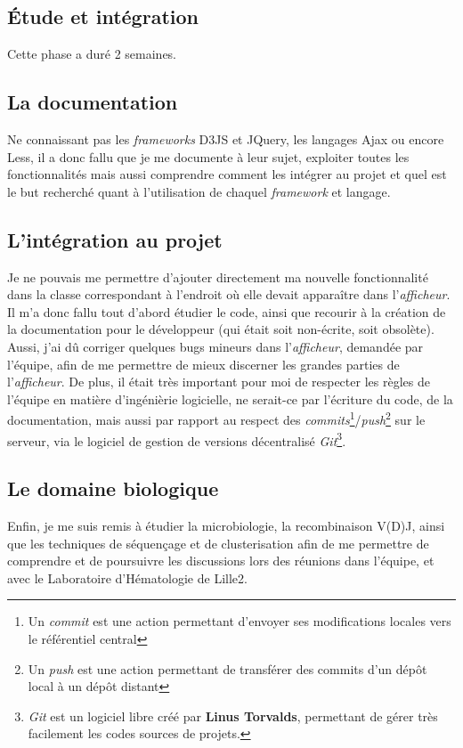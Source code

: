\documentclass[pdftex,12pt,a4paper]{report}
\begin{document}
\begin{spacing}{1.2}
\section{Étude et intégration}

Cette phase a duré 2 semaines.

\subsection{La documentation}
Ne connaissant pas les \textit{frameworks} D3JS et JQuery, les langages Ajax ou encore Less, il a donc fallu que je me documente à leur sujet, exploiter toutes les fonctionnalités mais aussi comprendre comment les intégrer au projet et quel est le but recherché quant à l'utilisation de chaquel \textit{framework} et langage.

\subsection{L'intégration au projet}
Je ne pouvais me permettre d'ajouter directement ma nouvelle fonctionnalité dans la classe correspondant à l'endroit où elle devait apparaître dans l'\textit{afficheur}. Il m'a donc fallu tout d'abord étudier le code, ainsi que recourir à la création de la documentation pour le développeur (qui était soit non-écrite, soit obsolète). Aussi, j'ai dû corriger quelques bugs mineurs dans l'\textit{afficheur}, demandée par l'équipe, afin de me permettre de mieux discerner les grandes parties de l'\textit{afficheur}.
\newline
De plus, il était très important pour moi de respecter les règles de l'équipe en matière d'ingénièrie logicielle, ne serait-ce par l'écriture du code, de la documentation, mais aussi par rapport au respect des \textit{commits}\footnote{Un \textit{commit} est une action permettant d'envoyer ses modifications locales vers le référentiel central}/\textit{push}\footnote{Un \textit{push} est une action permettant de transférer des commits d'un dépôt local à un dépôt distant} sur le serveur, via le logiciel de gestion de versions décentralisé \textit{Git}\footnote{\textit{Git} est un logiciel libre créé par \textbf{Linus Torvalds}, permettant de gérer très facilement les codes sources de projets.}.

\subsection{Le domaine biologique}
Enfin, je me suis remis à étudier la microbiologie, la recombinaison V(D)J, ainsi que les techniques de séquençage et de clusterisation afin de me permettre de comprendre et de poursuivre les discussions lors des réunions dans l'équipe, et avec le Laboratoire d'Hématologie de Lille2.


\end{spacing}
\end{document}
